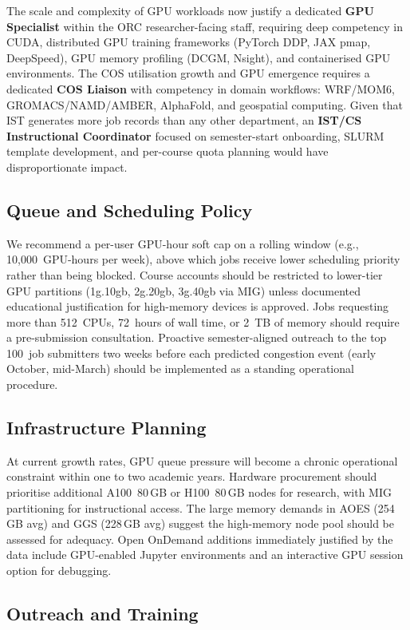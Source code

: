 \documentclass[11pt,letterpaper]{article}
\newcommand{\orc}{ORC}
\begin{document}
The scale and complexity of GPU workloads now justify a dedicated \textbf{GPU
Specialist} within the \orc{} researcher-facing staff, requiring deep competency
in CUDA, distributed GPU training frameworks (PyTorch DDP, JAX pmap, DeepSpeed),
GPU memory profiling (DCGM, Nsight), and containerised GPU environments.  The
COS utilisation growth and GPU emergence requires a dedicated \textbf{COS
Liaison} with competency in domain workflows: WRF/MOM6, GROMACS/NAMD/AMBER,
AlphaFold, and geospatial computing.  Given that IST generates more job records
than any other department, an \textbf{IST/CS Instructional Coordinator} focused
on semester-start onboarding, SLURM template development, and per-course quota
planning would have disproportionate impact.

\subsection{Queue and Scheduling Policy}

We recommend a per-user GPU-hour soft cap on a rolling window
(e.g., 10,000~GPU-hours per week), above which jobs receive lower scheduling
priority rather than being blocked.  Course accounts should be restricted to
lower-tier GPU partitions (1g.10gb, 2g.20gb, 3g.40gb via MIG) unless documented
educational justification for high-memory devices is approved.  Jobs requesting
more than 512~CPUs, 72~hours of wall time, or 2~TB of memory should require a
pre-submission consultation.  Proactive semester-aligned outreach to the top
100~job submitters two weeks before each predicted congestion event (early October,
mid-March) should be implemented as a standing operational procedure.

\subsection{Infrastructure Planning}

At current growth rates, GPU queue pressure will become a chronic operational
constraint within one to two academic years.  Hardware procurement should
prioritise additional A100~80\,GB or H100~80\,GB nodes for research, with MIG
partitioning for instructional access.  The large memory demands in AOES
(254\,GB avg) and GGS (228\,GB avg) suggest the high-memory node pool should be
assessed for adequacy.  Open OnDemand additions immediately justified by the data
include GPU-enabled Jupyter environments and an interactive GPU session option for
debugging.

\subsection{Outreach and Training}
\end{document}

